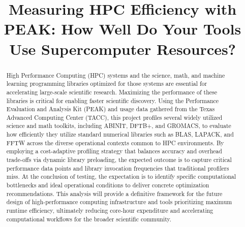 \documentclass[conference]{IEEEtran}
\begin{document}
\title{Measuring HPC Efficiency with PEAK: How Well Do Your Tools Use Supercomputer Resources?}

\author{
\and
{}
\and
{}
}

\maketitle

\begin{abstract}
High Performance Computing (HPC) systems and the science, math, and machine learning programming libraries optimized for those systems are essential for accelerating large-scale scientific research. Maximizing the performance of these libraries is critical for enabling faster scientific discovery. Using the Performance Evaluation and Analysis Kit (PEAK) and usage data gathered from the Texas Advanced Computing Center (TACC), this project profiles several widely utilized science and math toolkits, including ABINIT, DFTB+, and GROMACS, to evaluate how efficiently they utilize standard numerical libraries such as BLAS, LAPACK, and FFTW across the diverse operational contexts common to HPC environments. By employing a cost-adaptive profiling strategy that balances accuracy and overhead trade-offs via dynamic library preloading, the expected outcome is to capture critical performance data points and library invocation frequencies that traditional profilers miss. At the conclusion of testing, the expectation is to identify specific computational bottlenecks and ideal operational conditions to deliver concrete optimization recommendations. This analysis will provide a definitive framework for the future design of high-performance computing infrastructure and tools prioritizing maximum runtime efficiency, ultimately reducing core-hour expenditure and accelerating computational workflows for the broader scientific community.
\end{abstract}
\end{document}
